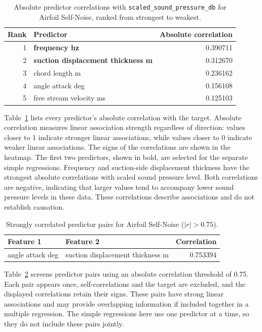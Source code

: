 \begin{table}[H]
\centering
\small
\begin{tabular}{rlr}
\toprule
Rank & Predictor & Absolute correlation \\
\midrule
1 & \textbf{frequency hz} & 0.390711 \\
2 & \textbf{suction displacement thickness m} & 0.312670 \\
3 & chord length m & 0.236162 \\
4 & angle attack deg & 0.156108 \\
5 & free stream velocity ms & 0.125103 \\
\bottomrule
\end{tabular}
\caption{Absolute predictor correlations with \texttt{scaled\_sound\_pressure\_db} for Airfoil Self-Noise, ranked from strongest to weakest.}
\label{tab:airfoil_target_corr}
\end{table}

Table~\ref{tab:airfoil_target_corr} lists every predictor's absolute correlation with the target. Absolute correlation measures linear association strength regardless of direction: values closer to 1 indicate stronger linear associations, while values closer to 0 indicate weaker linear associations. The signs of the correlations are shown in the heatmap. The first two predictors, shown in bold, are selected for the separate simple regressions. Frequency and suction-side displacement thickness have the strongest absolute correlations with scaled sound pressure level. Both correlations are negative, indicating that larger values tend to accompany lower sound pressure levels in these data. These correlations describe associations and do not establish causation.

\begin{table}[H]
\centering
\small
\begin{tabular}{llr}
\toprule
Feature 1 & Feature 2 & Correlation \\
\midrule
angle attack deg & suction displacement thickness m & 0.753394 \\
\bottomrule
\end{tabular}
\caption{Strongly correlated predictor pairs for Airfoil Self-Noise ($|r| > 0.75$).}
\label{tab:airfoil_predictor_pairs}
\end{table}

Table~\ref{tab:airfoil_predictor_pairs} screens predictor pairs using an absolute correlation threshold of 0.75. Each pair appears once, self-correlations and the target are excluded, and the displayed correlations retain their signs. These pairs have strong linear associations and may provide overlapping information if included together in a multiple regression. The simple regressions here use one predictor at a time, so they do not include these pairs jointly.

